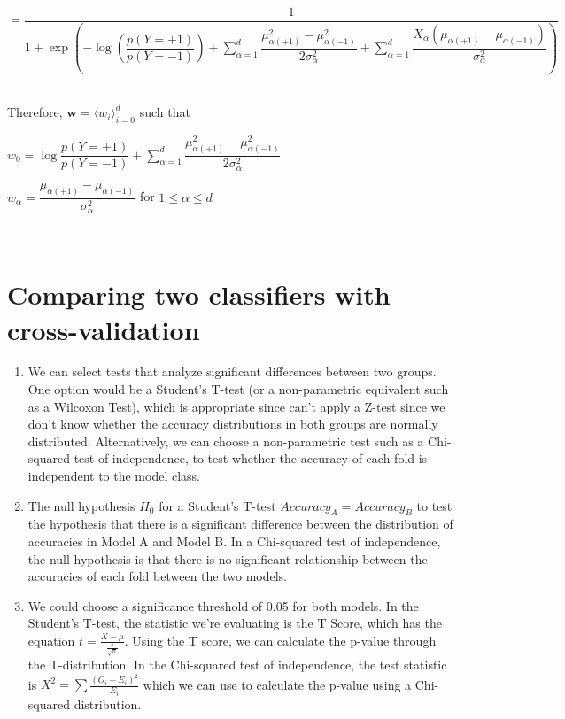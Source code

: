 \documentclass{article}
\begin{document}
\begin{enumerate}[label=(\alph*)]
\begin{center}$=\dfrac{1}
{1 + \exp\left(-\log\left(\dfrac{p(Y=+1)}{p(Y=-1)}\right) + 
\sum_{\alpha=1}^{d}\dfrac{\mu_{\alpha(+1)}^2 - \mu_{\alpha(-1)}^2}{2\sigma_\alpha^2}
+ \sum_{\alpha=1}^{d}\dfrac{X_\alpha(\mu_{\alpha(+1)} - \mu_{\alpha(-1)})}{\sigma_\alpha^2}\right)}$\end{center} \ \\

Therefore, $\mathbf{w} = \langle w_i \rangle_{i=0}^{d}$ such that
\begin{center}$w_0 = \log\dfrac{p(Y = +1)}{p(Y = -1)} + \sum_{\alpha=1}^{d}\dfrac{\mu_{\alpha(+1)}^2 - \mu_{\alpha(-1)}^2}{2\sigma_\alpha^2}$ \end{center}
\begin{center}$w_\alpha = \dfrac{\mu_{\alpha(+1)} - \mu_{\alpha(-1)}}{\sigma_\alpha^2}$ for $1 \leq \alpha \leq d$\end{center} \ \\

\end{enumerate}

\section{Comparing two classifiers with cross-validation}
\begin{enumerate}[label=(\alph*)]

\item We can select tests that analyze significant differences between two groups. One option would be a Student's T-test (or a non-parametric equivalent such as a Wilcoxon Test), which is appropriate since can't apply a Z-test since we don't know whether the accuracy distributions in both groups are normally distributed. Alternatively, we can choose a non-parametric test such as a Chi-squared test of independence, to test whether the accuracy of each fold is independent to the model class.
\item The null hypothesis $H_0$ for a Student's T-test $Accuracy_A = Accuracy_B$ to test the hypothesis that there is a significant difference between the distribution of accuracies in Model A and Model B. In a Chi-squared test of independence, the null hypothesis is that there is no significant relationship between the accuracies of each fold between the two models.
\item We could choose a significance threshold of 0.05 for both models. In the Student's T-test, the statistic we're evaluating is the T Score, which has the equation $t = \frac{X - \mu}{\frac{s}{\sqrt{n}}}$. Using the T score, we can calculate the p-value through the T-distribution. In the Chi-squared test of independence, the test statistic is $X^2 = \sum \frac{(O_i-E_i)^2}{E_i}$ which we can use to calculate the p-value using a Chi-squared distribution.

\end{enumerate}
\end{document}

